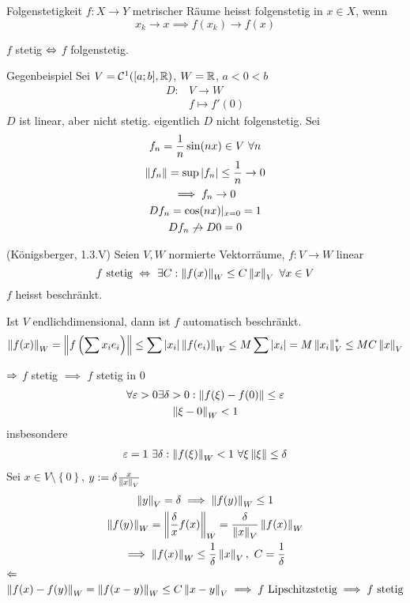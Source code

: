 \begin{Def}{Folgenstetigkeit}
  $f:X\to Y$ metrischer Räume heisst folgenstetig in $x\in X$, wenn
  \[x_k\to x\implies f(x_k)\to f(x)\]
\end{Def}
\begin{Lem}
  $f$ stetig $\Leftrightarrow$ $f$ folgenstetig.
\end{Lem}
\begin{Bsp}{Gegenbeispiel}
  Sei $V=\mathcal{C}^1([a;b],\mathbb{R})$, $W=\mathbb{R}$, $a<0<b$
  \begin{align*}
    D:&V\to W\\
    &f\mapsto f'(0)
  \end{align*}
  $D$ ist linear, aber nicht stetig. eigentlich $D$ nicht folgenstetig. Sei
  \begin{gather*}
    f_n=\frac{1}{n}\sin(nx)\in V\ \forall n\\
    \left\| f_n \right\|=\sup\left| f_n \right|\leq \frac{1}{n}\to 0\\
    \implies f_n\to 0\\
    D f_n=\cos(nx)|_{x=0}=1\\
    D f_n\not\to D 0=0
  \end{gather*}
\end{Bsp}
\begin{Sat}{(Königsberger, 1.3.V)}
  Seien $V,W$ normierte Vektorräume, $f:V\to W$ linear
  \[f\ \text{stetig}\ \Leftrightarrow\ \exists C:\left\| f(x) \right\|_W\leq C\left\| x \right\|_V\ \forall x\in V\]
  $f$ heisst beschränkt.
\end{Sat}
\begin{Bem}
  Ist $V$ endlichdimensional, dann ist $f$ automatisch beschränkt.
  \[\left\| f(x) \right\|_W=\left\| f\left(\sum x_i e_i\right) \right\|\leq \sum \left| x_i \right|\left\| f(e_i) \right\|_W\leq M\sum\left| x_i \right|=M\left\| x_i \right\|^*_V\leq MC\left\| x \right\|_V\]
\end{Bem}
\begin{Bew}
  $\Rightarrow$ $f$ stetig $\implies$ $f$ stetig in 0
  \begin{gather*}
    \forall \varepsilon>0\exists \delta>0:\left\| f(\xi)-f(0) \right\|\leq \varepsilon\\
    \left\| \xi -0 \right\|_W<1
  \end{gather*}
  insbesondere
  \begin{gather*}
    \varepsilon=1\ \exists\delta:\left\| f(\xi) \right\|_W<1\ \forall \xi \left\| \xi \right\|\leq \delta
  \end{gather*}
  Sei $x\in V\setminus \left\{ 0 \right\}$, $y:=\delta\frac{x}{\left\| x \right\|_V}$
  \begin{gather*}
    \Norm{y}_V=\delta\implies \Norm{f(y)}_W\leq 1\\
    \Norm{f(y)}_W=\Norm{\frac{\delta}{x}f(x)}_W=\frac{\delta}{\Norm{x}_V}\Norm{f(x)}_W\\
    \implies \Norm{f(x)}_W\leq \frac{1}{\delta}\Norm{x}_V,\ C=\frac{1}{\delta}
  \end{gather*}
  $\Leftarrow$
  \[\Norm{f(x)-f(y)}_W=\Norm{f(x-y)}_W\leq C\Norm{x-y}_V\implies f\ \text{Lipschitzstetig} \implies f \ \text{stetig}\]
\end{Bew}
